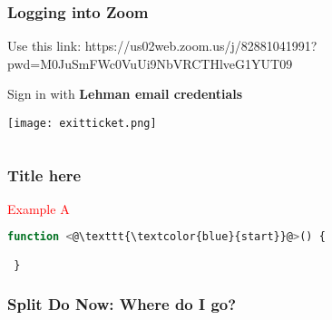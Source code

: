  \begin{frame}
\frametitle<presentation>{ Logging into Zoom }
Use this link: https://us02web.zoom.us/j/82881041991?pwd=M0JuSmFWc0VuUi9NbVRCTHlveG1YUT09

Sign in with \textbf{Lehman email credentials}



\begin{tcolorbox}[colback=blue!5,colframe=red!40!black,title=Reminders ]
\reminders
\end{tcolorbox}

\end{frame}







\texttt{[image: exitticket.png]}



\begin{columns}[T]
\end{columns}



\begin{frame}
\frametitle<presentation>{Title here}
\end{frame}



 \begin{minipage}[t]{0.45\textwidth}
 \textcolor{red}{Example A}
 \begin{lstlisting}[language=Javascript]
 function <@\texttt{\textcolor{blue}{start}}@>() {

 }
 \end{lstlisting}
 \end{minipage}




\begin{frame}
\frametitle<presentation>{Split Do Now: Where do I go?}

\end{frame}



